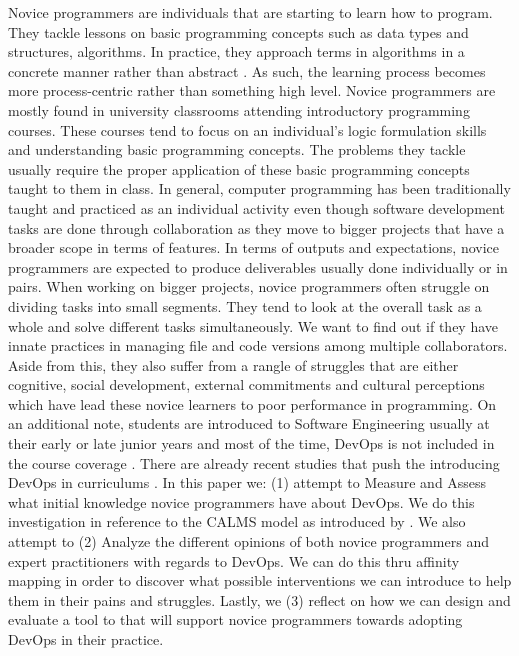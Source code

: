 \documentclass{sigchi}
\begin{document}
Novice programmers are individuals that are starting to learn how to program. They tackle lessons on basic programming concepts such as data types and structures, algorithms. In practice, they approach terms in algorithms in a concrete manner rather than abstract \cite{mccarthygame}. As such, the learning process becomes more process-centric rather than something high level\cite{teague2014longitudinal}. Novice programmers are mostly found in university classrooms attending introductory programming courses. These courses tend to focus on an individual's logic formulation skills and understanding basic programming concepts. The problems they tackle usually require the proper application of these basic programming concepts taught to them in class. In general, computer programming has been traditionally taught and practiced as an individual activity even though software development tasks are done through collaboration \cite{mcdowell2002effects} as they move to bigger projects that have a broader scope in terms of features. 
In terms of outputs and expectations, novice programmers are expected to produce deliverables usually done individually or in pairs. When working on bigger projects, novice programmers often struggle on dividing tasks into small segments. They tend to look at the overall task as a whole and solve different tasks simultaneously. We want to find out if they have innate practices in managing file and code versions among multiple collaborators. Aside from this, they also suffer from a rangle of struggles that are either cognitive, social development, external commitments and cultural perceptions which have lead these novice learners to poor performance in programming\cite{teague2008collaborative}. On an additional note, students are introduced to Software Engineering usually at their early or late junior years and most of the time, DevOps is not included in the course coverage \cite{bass2016software}. There are already recent studies that push the introducing DevOps in curriculums \cite{bruel2019software, jones2018proposal}. In this paper we: (1) attempt to Measure and Assess what initial knowledge novice programmers have about DevOps. We do this investigation in reference to the CALMS model as introduced by \cite{riley2014keep}. We also attempt to (2) Analyze the different opinions of both novice programmers and expert practitioners with regards to DevOps. We can do this thru affinity mapping in order to discover what possible interventions we can introduce to help them in their pains and struggles. Lastly, we (3) reflect on how we can design and evaluate a tool to that will support novice programmers towards adopting DevOps in their practice. 
\end{document}
